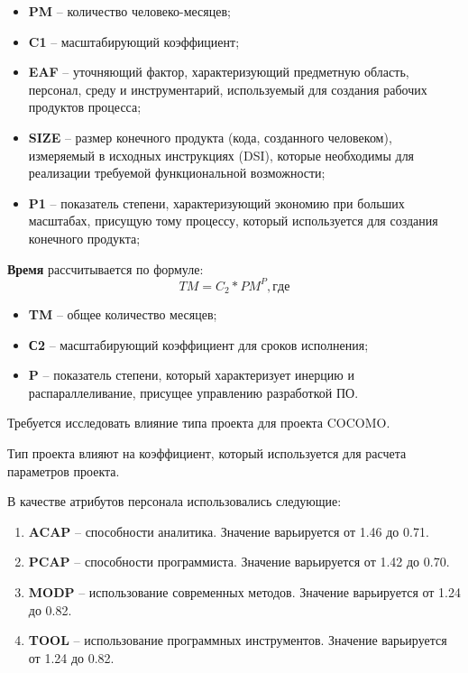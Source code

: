 \begin{itemize}
	\item \textbf{PM} -- количество человеко-месяцев;
	\item \textbf{C1} -- масштабирующий коэффициент;
	\item \textbf{EAF} -- уточняющий фактор, характеризующий предметную область, персонал, среду и инструментарий, используемый для создания рабочих продуктов процесса;
	\item \textbf{SIZE} -- размер конечного продукта (кода, созданного человеком), измеряемый в исходных инструкциях (DSI), которые необходимы для реализации требуемой функциональной возможности;
	\item \textbf{P1} -- показатель степени, характеризующий экономию при больших масштабах, присущую тому процессу, который используется для создания конечного продукта;
\end{itemize}

\textbf{Время} рассчитывается по формуле:
\begin{equation}
	TM = C_2 * PM^P, где
\end{equation}

\begin{itemize}
	\item \textbf{TM} -- общее количество месяцев;
	\item \textbf{С2} -- масштабирующий коэффициент для сроков исполнения;
	\item \textbf{P} -- показатель степени, который характеризует инерцию и распараллеливание, присущее управлению разработкой ПО.
\end{itemize}

Требуется исследовать влияние типа проекта для проекта COCOMO.

Тип проекта влияют на коэффициент, который используется для расчета параметров проекта.

В качестве атрибутов персонала использовались следующие:
\begin{enumerate}
	\item \textbf{ACAP} -- способности аналитика. Значение варьируется от 1.46 до 0.71.
	\item \textbf{PCAP} -- способности программиста. Значение варьируется от 1.42 до 0.70.
	\item \textbf{MODP} -- использование современных методов. Значение варьируется от 1.24 до 0.82.
	\item \textbf{TOOL} -- использование программных инструментов. Значение варьируется от 1.24 до 0.82.
\end{enumerate} 

